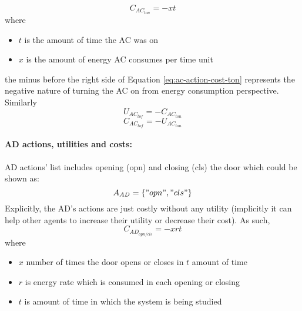 \documentclass{article}
\begin{document}
\begin{multicols}{2}
					\begin{equation}
						C_{{AC}_{ton}} = - xt
						\label{eq:ac-action-cost-ton}
					\end{equation}
					where 
					\begin{itemize}
						\item $t$ is the amount of time the AC was on
						\item $x$ is the amount of energy AC consumes per time unit
					\end{itemize}
					the minus before the right side of Equation \ref{eq:ac-action-cost-ton} represents the negative nature of turning the AC on from energy consumption perspective. Similarly
					\begin{equation}
						U_{{AC}_{tof}} = - C_{{AC}_{ton}}
						\label{eq:ac-action-utility-tof}
					\end{equation}
					\begin{equation}
						C_{{AC}_{tof}} = - U_{{AC}_{ton}}
						\label{eq:ac-action-cost-tof}
					\end{equation}
				
				\paragraph{AD actions, utilities and costs:} AD actions' list includes opening (opn) and closing (cls) the door which could be shown as:
					\begin{equation}
						A_{AD}=\{"opn","cls"\}
						\label{eq:ad-actions}
					\end{equation}
					Explicitly, the AD's actions are just costly without any utility (implicitly it can help other agents to increase their utility or decrease their cost). As such, 
					\begin{equation}
						C_{{AD}_{opn/cls}} = - xrt
						\label{eq:ad-action-cost-tof}
					\end{equation}
					where   
					\begin{itemize}
						\item $x$ number of times the door opens or closes in $t$ amount of time
						\item $r$ is energy rate which is consumed in each opening or closing
						\item $t$ is amount of time in which the system is being studied
					\end{itemize}
				

\end{multicols}
\end{document}

